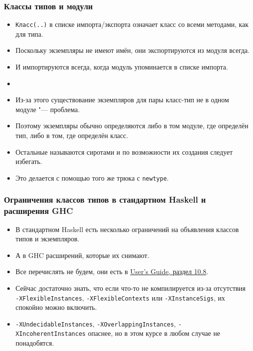 \documentclass[10pt]{beamer}
\begin{document}
\begin{frame}[fragile]
  \frametitle{Классы типов и модули}
  \begin{itemize}
    \item \lstinline|Класс(..)| в списке импорта/экспорта означает класс со всеми методами, как для типа.
    \item Поскольку экземпляры не имеют имён, они экспортируются из модуля всегда.
    \item И импортируются всегда, когда модуль упоминается в списке импорта.\pause
    \item[]
    \item Из-за этого существование экземпляров для пары класс-тип не в одном модуле "--- проблема.
    \item Поэтому экземпляры обычно определяются либо в том модуле, где определён тип, либо в том, где определён класс.
    \item Остальные называются сиротами и по возможности их создания следует избегать.
    \item Это делается с помощью того же трюка с \lstinline|newtype|.
  \end{itemize}
\end{frame}

\begin{frame}[fragile]
  \frametitle{Ограничения классов типов в стандартном Haskell и расширения GHC}
  \begin{itemize}
    \item В стандартном Haskell есть несколько ограничений на объявления классов типов и экземпляров.
    \item А в GHC расширений, которые их снимают.
    \item Все перечислять не будем, они есть в  \href{http://downloads.haskell.org/~ghc/latest/docs/html/users_guide/glasgow_exts.html#class-declarations}{User's Guide, раздел 10.8}.
    \item Сейчас достаточно знать, что если что-то не компилируется из-за отсутствия \lstinline|-XFlexibleInstances|, \lstinline|-XFlexibleContexts| или \lstinline|-XInstanceSigs|, их спокойно можно включить.
    \item \lstinline|-XUndecidableInstances|, \lstinline|-XOverlappingInstances|, \lstinline|-XIncoherentInstances| опаснее, но в этом курсе в любом случае не понадобятся.
  \end{itemize}
\end{frame}

%
\end{document}
